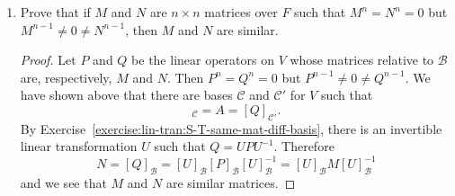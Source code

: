 \begin{enumerate}
\begin{proof}
    Now suppose $c_1,c_2,\dots,c_n$ are scalars in $F$ such that
    \begin{equation*}
      c_1\beta_1 + c_2\beta_2 + \cdots + c_n\beta_n = 0.
    \end{equation*}
    Taking $S^{n-1}$ of both sides gives $c_1\beta_n = 0$, which
    implies that $c_1 = 0$. So
    \begin{equation*}
      c_2\beta_2 + c_3\beta_3 + \cdots + c_n\beta_n = 0,
    \end{equation*}
    and we can take $S^{n-2}$ of both sides to get $c_2\beta_n = 0$,
    implying that $c_2$ is zero. More generally, assuming that
    $c_1,\dots,c_k$ are all zero for some $k$ with $1\leq k\leq n-1$,
    we have
    \begin{equation*}
      c_{k+1}\beta_{k+1} + \cdots + c_n\beta_n = 0.
    \end{equation*}
    Taking $S^{n-k-1}$ of both sides (in the case where $k = n-1$, we
    take $S^0 = I$) then gives $c_{k+1}\beta_n = 0$, so that
    $c_{k+1} = 0$. Therefore $c_1 = c_2 = \cdots = c_n = 0$ and
    $\mathcal{B}'$ is linearly independent. Since $\dim V = n$ and
    $\mathcal{B}'$ is a linearly independent set of $n$ vectors in
    $V$, it follows that $\mathcal{B}'$ is a basis for $V$.

    Finally, we have defined $\beta_1,\dots,\beta_n$ so that
    \begin{equation*}
      S\beta_j = \beta_{j+1}, \quad
      j = 1, \dots, n - 1, \quad
      S\beta_n = 0.
    \end{equation*}
    Therefore we have $[S]_{\mathcal{B}'} = A$.
  \end{proof}

\item Prove that if $M$ and $N$ are $n\times n$ matrices over $F$ such
  that $M^n = N^n = 0$ but $M^{n-1}\neq 0\neq N^{n-1}$, then $M$ and
  $N$ are similar.
  \begin{proof}
    Let $P$ and $Q$ be the linear operators on $V$ whose matrices
    relative to $\mathcal{B}$ are, respectively, $M$ and $N$. Then
    $P^n = Q^n = 0$ but $P^{n-1}\neq0\neq Q^{n-1}$. We have shown
    above that there are bases $\mathcal{C}$ and $\mathcal{C}'$ for
    $V$ such that
    \begin{equation*}
      [P]_{\mathcal{C}} = A = [Q]_{\mathcal{C}'}.
    \end{equation*}
    By Exercise~\ref{exercise:lin-tran:S-T-same-mat-diff-basis}, there
    is an invertible linear transformation $U$ such that
    $Q = UPU^{-1}$. Therefore
    \begin{equation*}
      N = [Q]_{\mathcal{B}}
      = [U]_{\mathcal{B}}[P]_{\mathcal{B}}[U]_{\mathcal{B}}^{-1}
      = [U]_{\mathcal{B}}M[U]_{\mathcal{B}}^{-1}
    \end{equation*}
    and we see that $M$ and $N$ are similar matrices.
  \end{proof}
\end{enumerate}
